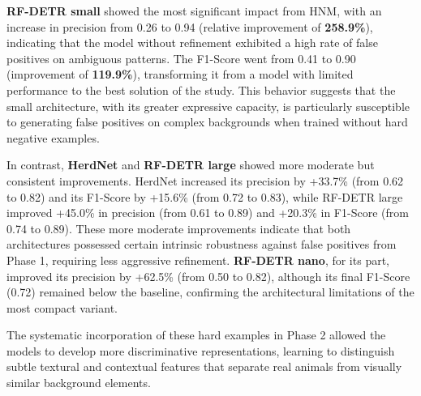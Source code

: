 \textbf{RF-DETR small} showed the most significant impact from HNM, with an increase in precision from 0.26 to 0.94 (relative improvement of \textbf{258.9\%}), indicating that the model without refinement exhibited a high rate of false positives on ambiguous patterns. The F1-Score went from 0.41 to 0.90 (improvement of \textbf{119.9\%}), transforming it from a model with limited performance to the best solution of the study. This behavior suggests that the small architecture, with its greater expressive capacity, is particularly susceptible to generating false positives on complex backgrounds when trained without hard negative examples.

In contrast, \textbf{HerdNet} and \textbf{RF-DETR large} showed more moderate but consistent improvements. HerdNet increased its precision by +33.7\% (from 0.62 to 0.82) and its F1-Score by +15.6\% (from 0.72 to 0.83), while RF-DETR large improved +45.0\% in precision (from 0.61 to 0.89) and +20.3\% in F1-Score (from 0.74 to 0.89). These more moderate improvements indicate that both architectures possessed certain intrinsic robustness against false positives from Phase 1, requiring less aggressive refinement. \textbf{RF-DETR nano}, for its part, improved its precision by +62.5\% (from 0.50 to 0.82), although its final F1-Score (0.72) remained below the baseline, confirming the architectural limitations of the most compact variant.

The systematic incorporation of these hard examples in Phase 2 allowed the models to develop more discriminative representations, learning to distinguish subtle textural and contextual features that separate real animals from visually similar background elements.

